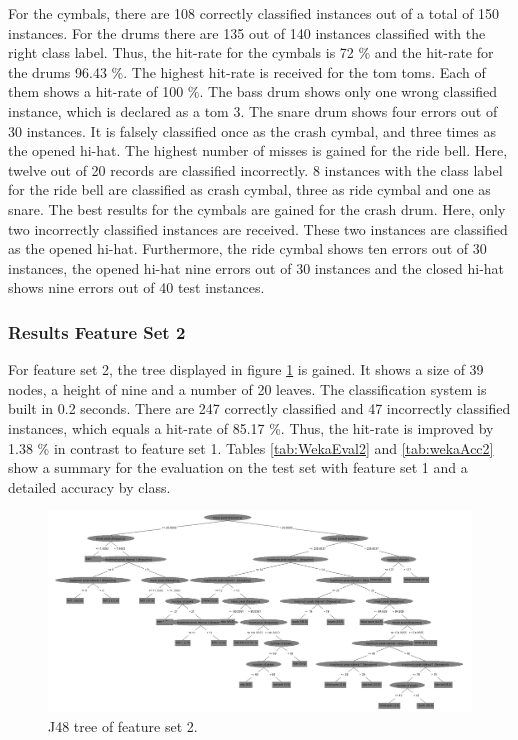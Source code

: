 For the cymbals, there are 108 correctly classified instances out of a total of 150 instances. For the drums there are 135 out of 140 instances classified with the right class label. Thus, the hit-rate for the cymbals is 72 \% and the hit-rate for the drums 96.43 \%. The highest hit-rate is received for the tom toms. Each of them shows a hit-rate of 100 \%. The bass drum shows only one wrong classified instance, which is declared as a tom 3. The snare drum shows four errors out of 30 instances. It is falsely classified once as the crash cymbal, and three times as the opened hi-hat. The highest number of misses is gained for the ride bell. Here, twelve out of 20 records are classified incorrectly. 8 instances with the class label for the ride bell are classified as crash cymbal, three as ride cymbal and one as snare. The best results for the cymbals are gained for the crash drum. Here, only two incorrectly classified instances are received. These two instances are classified as the opened hi-hat. Furthermore, the ride cymbal shows ten errors out of 30 instances, the opened hi-hat nine errors out of 30 instances and the closed hi-hat shows nine errors out of 40 test instances.

\subsubsection{Results Feature Set 2}

For feature set 2, the tree displayed in figure \ref{fig:wekaTree2} is gained. It shows a size of 39 nodes, a height of nine and a number of 20 leaves. The classification system is built in 0.2 seconds. There are 247 correctly classified and 47 incorrectly classified instances, which equals a hit-rate of 85.17 \%. Thus, the hit-rate is improved by 1.38 \% in contrast to feature \linebreak set 1. Tables \ref{tab:WekaEval2} and \ref{tab:wekaAcc2} show a summary for the evaluation on the test set with feature set 1 and a detailed accuracy by class.

\begin{figure}[bp]
	\centering
  \includegraphics[width=\textwidth]{images/weka/weka_tree_2.png}
	\caption{J48 tree of feature set 2.}
	\label{fig:wekaTree2}
\end{figure}

